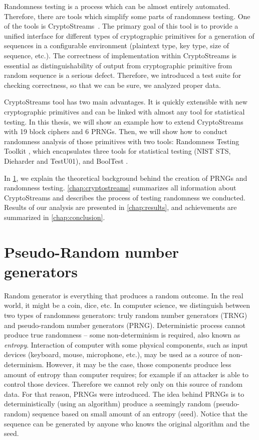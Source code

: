 \documentclass[
    digital,    %
    oneside,    %
    color,
    11pt,
    nocover,
    notable,
    nolof,
    nolot,
    final
]{fithesis3}
\renewcommand\_{\textunderscore\allowbreak}
\begin{document}
Randomness testing is a process which can be almost entirely automated. Therefore, there are tools which simplify some parts of randomness testing. One of the tools is CryptoStreams~\cite{CryptoStreams}. The primary goal of this tool is to provide a unified interface for different types of cryptographic primitives for a generation of sequences in a configurable environment (plaintext type, key type, size of sequence, etc.). The correctness of implementation within CryptoStreams is essential as distinguishability of output from cryptographic primitive from random sequence is a serious defect. Therefore, we introduced a test suite for checking correctness, so that we can be sure, we analyzed proper data. 

CryptoStreams tool has two main advantages. It is quickly extensible with new cryptographic primitives and can be linked with almost any tool for statistical testing. In this thesis, we will show an example how to extend CryptoStreams with 19 block ciphers and 6 PRNGs. Then, we will show how to conduct randomness analysis of those primitives with two tools: Randomness Testing Toolkit \cite{Obratil2017thesis}, which encapsulates three tools for statistical testing (NIST STS, Dieharder and TestU01), and BoolTest \cite{booltest-secrypt2017}. 

In \cref{chap:pseudo-random-generators}, we explain the theoretical background behind the creation of PRNGs and randomness testing. \cref{chap:cryptostreams} summarizes all information about CryptoStreams and describes the process of testing randomness we conducted. Results of our analysis are presented in \cref{chap:results}, and achievements are summarized in \cref{chap:conclusion}.

\chapter{Pseudo-Random number generators}
\label{chap:pseudo-random-generators}

Random generator is everything that produces a random outcome. In the real world, it might be a coin, dice, etc. In computer science, we distinguish between two types of randomness generators: truly random number generators (TRNG) and pseudo-random number generators (PRNG). Deterministic process cannot produce true randomness -- some non-determinism is required, also known as \textit{entropy}. Interaction of computer with some physical components, such as input devices (keyboard, mouse, microphone, etc.), may be used as a source of non-determinism. However, it may be the case, those components produce less amount of entropy than computer requires; for example if an attacker is able to control those devices. Therefore we cannot rely only on this source of random data. For that reason, PRNGs were introduced. The idea behind PRNGs is to deterministically (using an algorithm) produce a seemingly random (pseudo-random) sequence based on small amount of an entropy (seed). Notice that the sequence can be generated by anyone who knows the original algorithm and the seed. \cite{jakobsson2014theory}
\end{document}
